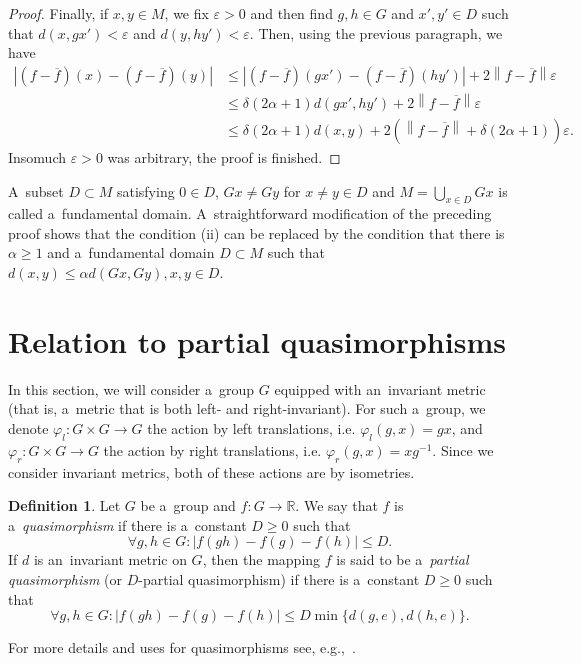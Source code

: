 \documentclass[11pt,a4paper]{amsart}
\theoremstyle{definition}
\newtheorem{definition}[theorem]{Definition}
\newcommand{\R}{\mathbb{R}}
\newcommand{\eps}{\varepsilon}
\newcommand{\fBar}{\overline{f}}
\newcommand{\abs}[1]{\left| #1 \right|}
\newcommand{\norm}[1]{\left\| #1 \right\|}
\begin{document}
\begin{proof}
		Finally, if $x, y \in M$, we fix $\eps > 0$ and then find $g, h \in G$ and $x', y' \in D$ such that $d(x, gx') < \eps$ and $d(y, hy') < \eps$. Then, using the previous paragraph, we have
		\begin{align*}
			\abs{(f-\fBar)(x) - (f-\fBar)(y)}
			&\leq \abs{(f-\fBar)(gx') - (f-\fBar)(hy')} + 2\norm{f - \fBar}\eps\\
			&\leq \delta (2\alpha + 1) d(gx', hy') + 2\norm{f - \fBar}\eps\\
			&\leq \delta (2\alpha + 1) d(x, y) + 2(\norm{f - \fBar} + \delta (2\alpha + 1))\eps.
		\end{align*}
		Insomuch $\eps > 0$ was arbitrary, the proof is finished.
	\end{proof}

	A~subset $D \subset M$ satisfying $0 \in D$, $Gx \neq Gy$ for $x \neq y \in D$ and $M = \bigcup_{x \in D} Gx$ is called a~fundamental domain. A~straightforward modification of the preceding proof shows that the condition (ii) can be replaced by the condition that there is $\alpha \geq 1$ and a~fundamental domain $D \subset M$ such that $d(x, y) \leq \alpha d(Gx, Gy), x, y \in D$.
	
	
	
	\section{Relation to partial quasimorphisms} \label{sect:quasimorphisms}
	
	In this section, we will consider a~group $G$ equipped with an~invariant metric (that is, a~metric that is both left- and right-invariant). For such a~group, we denote $\varphi_l: G \times G \to G$ the action by left translations, i.e. $\varphi_l(g, x) = gx$, and $\varphi_r: G \times G \to G$ the action by right translations, i.e. $\varphi_r(g, x) = xg^{-1}$. Since we consider invariant metrics, both of these actions are by isometries.
	
	\begin{definition}
		Let $G$ be a~group and $f: G \to \R$. We say that $f$ is a~\emph{quasimorphism} if there is a~constant $D \geq 0$ such that
		\begin{equation*}
			\forall g, h \in G \colon \abs{f(gh) - f(g) - f(h)} \leq D.
		\end{equation*}
		If $d$ is an~invariant metric on $G$, then the mapping $f$ is said to be a~\emph{partial quasimorphism} (or $D$-partial quasimorphism) if there is a~constant $D \geq 0$ such that
		\begin{equation*}
			\forall g, h \in G \colon \abs{f(gh) - f(g) - f(h)} \leq D \min\{d(g, e), d(h, e)\}.
		\end{equation*}
	\end{definition}
	For more details and uses for quasimorphisms see, e.g.,~\cite{Calegari}.
	
\end{document}
